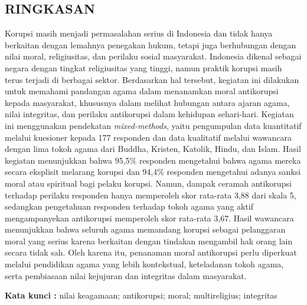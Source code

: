 \newpage
\begin{center}
    \section*{\textbf{RINGKASAN}}
\end{center}

Korupsi masih menjadi permasalahan serius di Indonesia dan tidak hanya berkaitan dengan lemahnya penegakan hukum, tetapi juga berhubungan dengan nilai moral, religiusitas, dan perilaku sosial masyarakat. Indonesia dikenal sebagai negara dengan tingkat religiusitas yang tinggi, namun praktik korupsi masih terus terjadi di berbagai sektor. Berdasarkan hal tersebut, kegiatan ini dilakukan untuk memahami pandangan agama dalam menanamkan moral antikorupsi kepada masyarakat, khususnya dalam melihat hubungan antara ajaran agama, nilai integritas, dan perilaku antikorupsi dalam kehidupan sehari-hari. Kegiatan ini menggunakan pendekatan \textit{mixed-methods}, yaitu pengumpulan data kuantitatif melalui kuesioner kepada 177 responden dan data kualitatif melalui wawancara dengan lima tokoh agama dari Buddha, Kristen, Katolik, Hindu, dan Islam. Hasil kegiatan menunjukkan bahwa 95,5\% responden mengetahui bahwa agama mereka secara eksplisit melarang korupsi dan 94,4\% responden mengetahui adanya sanksi moral atau spiritual bagi pelaku korupsi. Namun, dampak ceramah antikorupsi terhadap perilaku responden hanya memperoleh skor rata-rata 3,88 dari skala 5, sedangkan pengetahuan responden terhadap tokoh agama yang aktif mengampanyekan antikorupsi memperoleh skor rata-rata 3,67. Hasil wawancara menunjukkan bahwa seluruh agama memandang korupsi sebagai pelanggaran moral yang serius karena berkaitan dengan tindakan mengambil hak orang lain secara tidak sah. Oleh karena itu, penanaman moral antikorupsi perlu diperkuat melalui pendidikan agama yang lebih kontekstual, keteladanan tokoh agama, serta pembiasaan nilai kejujuran dan integritas dalam masyarakat.

\noindent\textbf{Kata kunci :} nilai keagamaan; antikorupsi; moral; multireligius; integritas